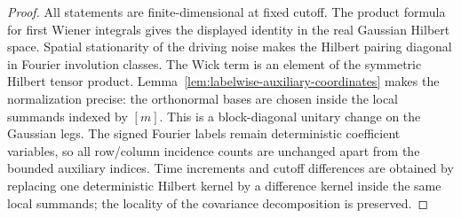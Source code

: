 \documentclass[10pt]{amsart}
\numberwithin{equation}{section}
\theoremstyle{plain}
\theoremstyle{definition}
\theoremstyle{remark}
\begin{document}
\begin{proof}
All statements are finite-dimensional at fixed cutoff.  The product formula for first Wiener integrals gives the displayed identity in the real Gaussian Hilbert space.  Spatial stationarity of the driving noise makes the Hilbert pairing diagonal in Fourier involution classes.  The Wick term is an element of the symmetric Hilbert tensor product.  Lemma~\ref{lem:labelwise-auxiliary-coordinates} makes the normalization precise: the orthonormal bases are chosen inside the local summands indexed by $[m]$.  This is a block-diagonal unitary change on the Gaussian legs.  The signed Fourier labels remain deterministic coefficient variables, so all row/column incidence counts are unchanged apart from the bounded auxiliary indices.  Time increments and cutoff differences are obtained by replacing one deterministic Hilbert kernel by a difference kernel inside the same local summands; the locality of the covariance decomposition is preserved.
\end{proof}
\end{document}
